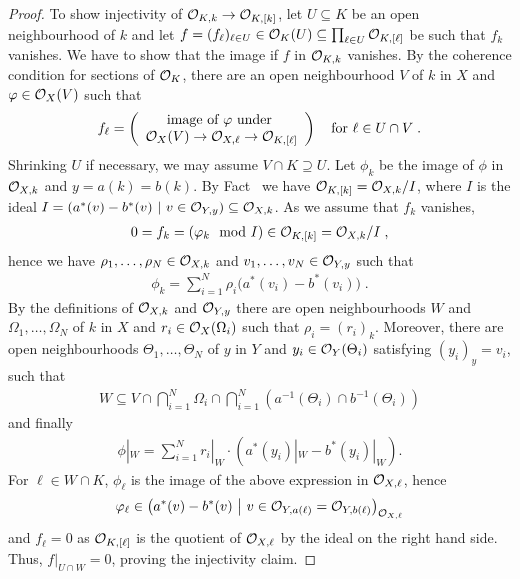 \documentclass[a4paper,parskip=half,numbers=enddot, DIV=12]{scrreprt}
\begin{document}
\begin{proof}
    To show injectivity of $\Oo_{K,k}\morphism\Oo_{K,[k]}$, let $U\subseteq K$ be an open neighbourhood of $k$ and let $f= (f_\ell)_{\ell\in U} \in \mathcal{O}_K(U) \subseteq \prod_{\ell\in U} \mathcal{O}_{K,[\ell]}$ be such that $f_k$ vanishes. We have to show that the image if $f$ in $\mathcal{O}_{K,k}$ vanishes. By the coherence condition for sections of $\mathcal{O}_K$, there are an open neighbourhood $V$ of $k$ in $X$ and $\varphi\in \mathcal{O}_X(V)$ such that 
    \begin{align*}
    	f_\ell=\left(
    	\begin{array}{c}
	    	\text{image of }\phi\text{ under }\\
	    	\Oo_X(V) \morphism\Oo_{X,\ell} \morphism\Oo_{K,[\ell]} 
    	\end{array}\right)\quad\text{for }\ell\in U\cap V\;.
    \end{align*}
    Shrinking $U$ if necessary, we may assume $V\cap K \supseteq U$. Let $\phi_k$ be the image of $\phi$ in $\mathcal{O}_{X,k}$ and  $y=a(k)=b(k)$. By  Fact~ we have $\mathcal{O}_{K,[k]}=\mathcal{O}_{X,k}/I$, where $I$ is the ideal $I=\left(a^*(v)-b^*(v)\ \middle|\  v\in \mathcal{O}_{Y,y}\right)\subseteq\mathcal{O}_{X,k}$. As we assume that $f_k$ vanishes,
    \begin{align*}
    	0 = f_k=(\varphi_k\mod I)\in\mathcal{O}_{K,[k]}=\mathcal{O}_{X,k}/I\;, 
    \end{align*}
    hence we have $\rho_1,\ldots,\rho_N\in \mathcal{O}_{X,k}$ and $v_1,\ldots,v_N\in \mathcal{O}_{Y,y}$ such that
    \begin{align*}
        \phi_k = \sum_{i=1}^N \rho_i\big(a^*(v_i) -b^*(v_i)\big)\;.
    \end{align*}
    By the definitions of $\mathcal{O}_{X,k}$ and $\mathcal{O}_{Y,y}$ there are open neighbourhoods $W$ and $\Omega_1,\ldots,\Omega_N$ of $k$ in $X$ and $r_i \in \mathcal{O}_X(\Omega_i)$ such that $\rho_i = (r_i)_k$. Moreover, there are open neighbourhoods $\Theta_1,\ldots,\Theta_N$ of $y$ in $Y$ and $y_i \in \mathcal{O}_Y(\Theta_i)$ satisfying $(y_i)_y = v_i$, such that 
    \begin{align*}
        W\subseteq V\cap \bigcap_{i=1}^N \Omega_i \cap\bigcap_{i=1}^N \left(a^{-1}(\Theta_i) \cap b^{-1}(\Theta_i)\right)
    \end{align*}
    and finally
    \begin{align*}
        \phi|_W = \sum_{i=1}^N r_i|_W \cdot \left(a^*(y_i)|_W -b^*(y_i)|_W\right).
    \end{align*}
    For $\ell\in W\cap K$, $\phi_\ell$ is the image of the above expression in $\mathcal{O}_{X,\ell}$, hence 
    \begin{align*}
        \varphi_\ell\in \left(a^*(v) -b^*(v)\ \middle|\  v\in \mathcal{O}_{Y,a(\ell)} = \mathcal{O}_{Y,b(\ell)}\right)_{\mathcal{O}_{X,\ell}}
    \end{align*}
    and $f_\ell =0$ as $\mathcal{O}_{K,[\ell]}$ is the quotient of $\mathcal{O}_{X,\ell}$ by the ideal on the right hand side. Thus, $f|_{U\cap W} =0$, proving the injectivity claim.
	

\end{proof}
\end{document}
